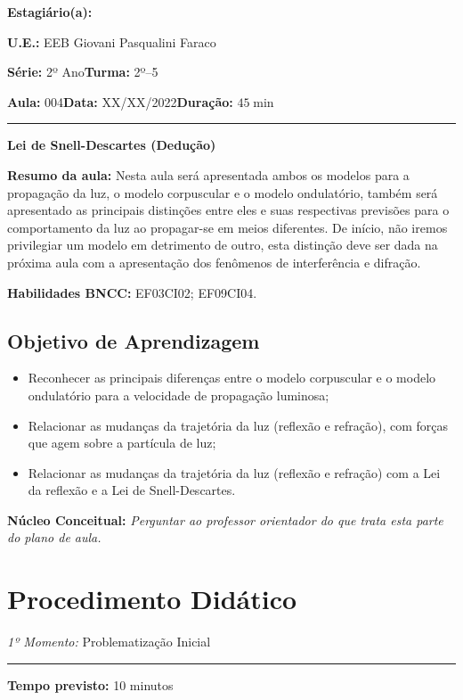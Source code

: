     \noindent \textbf{Estagiário(a): }\imprimirautor 
    
    \noindent \textbf{U.E.: }EEB Giovani Pasqualini Faraco
    
    \noindent \textbf{Série: }2º Ano\hfill{}\textbf{Turma: }2º--5
    
    \noindent \textbf{Aula:} 004\hfill{}\textbf{Data:} XX/XX/2022\hfill{}\textbf{Duração:} $45\min$
    \rule{\textwidth}{.5pt}
    \bigskip{}  
    

    \noindent
    \begin{center}
      \textbf{Lei de Snell-Descartes (Dedução)}
    \par\end{center}

    \noindent \textbf{Resumo da aula:} Nesta aula será apresentada ambos os modelos para a propagação da luz, o modelo corpuscular e o modelo ondulatório, também será apresentado as principais distinções entre eles e suas respectivas previsões para o comportamento da luz ao propagar-se em meios diferentes. De início, não iremos privilegiar um modelo em detrimento de outro, esta distinção deve ser dada na próxima aula com a apresentação dos fenômenos de interferência e difração.

    \par\noindent \textbf{Habilidades BNCC: }EF03CI02; EF09CI04.
	
    \subsection*{Objetivo de Aprendizagem}
    \begin{itemize}
        \item Reconhecer as principais diferenças entre o modelo corpuscular e o modelo ondulatório para a velocidade de propagação luminosa;
        \item Relacionar as mudanças da trajetória da luz (reflexão e refração), com forças que agem sobre a partícula de luz;
        \item Relacionar as mudanças da trajetória da luz (reflexão e refração) com a Lei da reflexão e a Lei de Snell-Descartes. 
    \end{itemize}
    
    \medskip{}
    
    \noindent \textbf{Núcleo Conceitual:} \emph{Perguntar ao professor orientador do que trata esta parte do plano de aula.}
    \newpage
    
    \section*{Procedimento Didático} 
    \noindent \emph{1º Momento:} Problematização Inicial
	\par\noindent\rule{.3\textwidth}{.5pt}  
    \par\noindent \textbf{Tempo previsto:} 10 minutos

